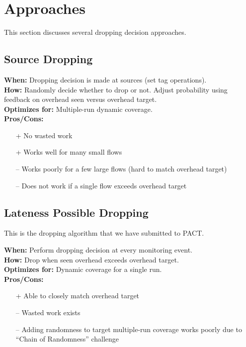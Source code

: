 \documentclass[11pt, letterpaper]{article}
\begin{document}
\section{Approaches}
\label{sec:approaches}
This section discusses several dropping decision approaches.

\subsection{Source Dropping}
\label{sec:source}
\textbf{When: } Dropping decision is made at sources (set tag operations). \\
\textbf{How: } Randomly decide whether to drop or not. Adjust probability using feedback on overhead seen versus overhead target. \\
\textbf{Optimizes for: } Multiple-run dynamic coverage. \\
\textbf{Pros/Cons: }
\begin{itemize}
  \item[+] No wasted work
  \item[+] Works well for many small flows
  \item[--] Works poorly for a few large flows (hard to match overhead target)
  \item[--] Does not work if a single flow exceeds overhead target
\end{itemize}

\subsection{Lateness Possible Dropping}
\label{sec:latest}
This is the dropping algorithm that we have submitted to PACT.

\noindent\textbf{When: } Perform dropping decision at every monitoring event. \\
\textbf{How: } Drop when seen overhead exceeds overhead target. \\
\textbf{Optimizes for: } Dynamic coverage for a single run. \\
\textbf{Pros/Cons: } 
\begin{itemize}
  \item[+] Able to closely match overhead target
  \item[--] Wasted work exists
  \item[--] Adding randomness to target multiple-run coverage works poorly due to ``Chain of Randomness'' challenge
\end{itemize}
\end{document}
